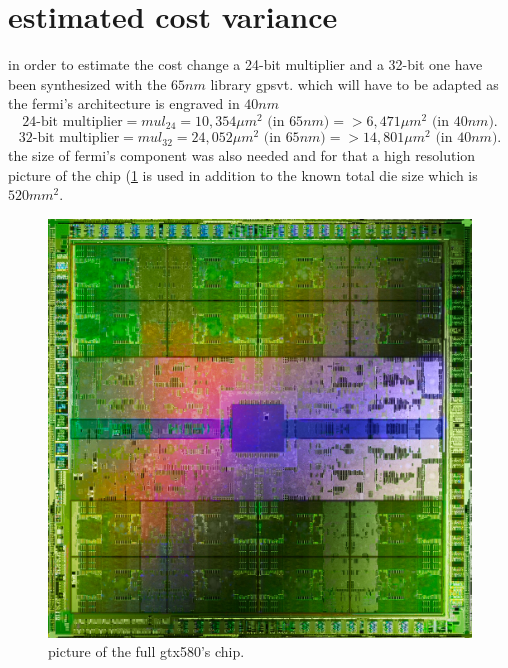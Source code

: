 \documentclass{report}
\begin{document}
   \section{estimated cost variance}
   in order to estimate the cost change a 24-bit multiplier and a 32-bit one have been synthesized with the $65nm$ library gpsvt. which will have to be adapted as the fermi's architecture is engraved in $40nm$ \cite{gtx580datasheet}
   \[\text{24-bit multiplier} = mul_{24} = 10,354 \mu m^2 \text{ (in $65nm$)} => 6,471 \mu m^2 \text{ (in $40nm$)}.\]
   \[\text{32-bit multiplier} = mul_{32} = 24,052 \mu m^2 \text{ (in $65nm$)} => 14,801 \mu m^2 \text{ (in $40nm$)}.\]
   the size of fermi's component was also needed and for that a high resolution picture of the chip (\ref{fig:fermichip} is used in addition to the known total die size which is $520 mm^2$\cite{g5xxwiki}.
   \begin{figure}[h]
    \centering
        \includegraphics[width=0.7\linewidth]{pictures/fermichip}
        \captionsetup{justification=centering}
        \caption{picture of the full gtx580's chip.}
        \label{fig:fermichip}
    \end{figure}
   
\end{document}
